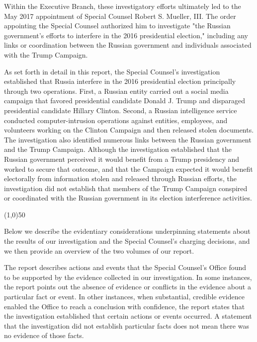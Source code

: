 \documentclass{article}
\newcommand{\hr}{\begin{center} \line(1,0){50} \end{center}}
\begin{document}
Within the Executive Branch, these investigatory efforts ultimately led to the May 2017 appointment of Special Counsel Robert S. Mueller, III.
The order appointing the Special Counsel authorized him to investigate "the Russian government's efforts to interfere in the 2016 presidential election," including any links or coordination between the Russian government and individuals associated with the Trump Campaign.

As set forth in detail in this report, the Special Counsel's investigation established that Russia interfere in the 2016 presidential election principally through two operations.
First, a Russian entity carried out a social media campaign that favored presidential candidate Donald J. Trump and disparaged presidential candidate Hillary Clinton.
Second, a Russian intelligence service conducted computer-intrusion operations against entities, employees, and volunteers working on the Clinton Campaign and then released stolen documents.
The investigation also identified numerous links between the Russian government and the Trump Campaign.
Although the investigation established that the Russian government perceived it would benefit from a Trump presidency and worked to secure that outcome, and that the Campaign expected it would benefit electorally from information stolen and released through Russian efforts, the investigation did not establish that members of the Trump Campaign conspired or coordinated with the Russian government in its election interference activities.

\hr

Below we describe the evidentiary considerations underpinning statements about the results of our investigation and the Special Counsel's charging decisions, and we then provide an overview of the two volumes of our report.

The report describes actions and events that the Special Counsel's Office found to be supported by the evidence collected in our investigation.
In some instances, the report points out the absence of evidence or conflicts in the evidence about a particular fact or event.
In other instances, when substantial, credible evidence enabled the Office to reach a conclusion with confidence, the report states that the investigation established that certain actions or events occurred.
A statement that the investigation did not establish particular facts does not mean there was no evidence of those facts.
\end{document}

